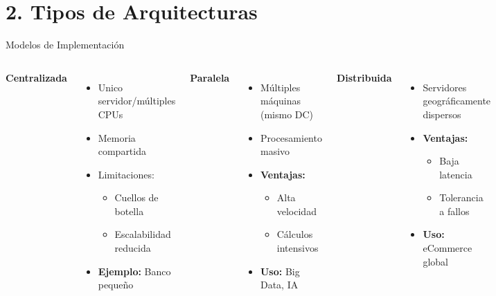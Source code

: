 \documentclass{beamer}
\begin{document}
\section{2. Tipos de Arquitecturas}
\begin{frame}{Modelos de Implementación}
\begin{columns}[T]
\textbf{Centralizada}
\begin{itemize}
    \item Unico servidor/múltiples CPUs
    \item Memoria compartida
    \item \alert{Limitaciones:}
    \begin{itemize}
        \item Cuellos de botella
        \item Escalabilidad reducida
    \end{itemize}
    \item \textbf{Ejemplo:} Banco pequeño
\end{itemize}

\textbf{Paralela}
\begin{itemize}
    \item Múltiples máquinas (mismo DC)
    \item Procesamiento masivo
    \item \textbf{Ventajas:}
    \begin{itemize}
        \item Alta velocidad
        \item Cálculos intensivos
    \end{itemize}
    \item \textbf{Uso:} Big Data, IA
\end{itemize}

\textbf{Distribuida}
\begin{itemize}
    \item Servidores geográficamente dispersos
    \item \textbf{Ventajas:}
    \begin{itemize}
        \item Baja latencia
        \item Tolerancia a fallos
    \end{itemize}
    \item \textbf{Uso:} eCommerce global
\end{itemize}
\end{columns}
\end{frame}
\end{document}
